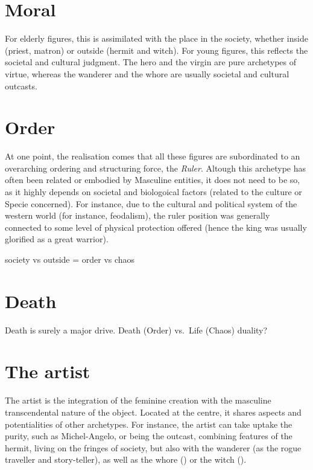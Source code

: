 \documentclass[
]{book}
\begin{document}
\hypertarget{moral}{%
\section{Moral}\label{moral}}

For elderly figures, this is assimilated with the place in the society, whether inside (priest, matron) or outside (hermit and witch). For young figures, this reflects the societal and cultural judgment. The hero and the virgin are pure archetypes of virtue, whereas the wanderer and the whore are usually societal and cultural outcasts.

\hypertarget{order}{%
\section{Order}\label{order}}

At one point, the realisation comes that all these figures are subordinated to an overarching ordering and structuring force, the \emph{Ruler}. Altough this archetype has often been related or embodied by Masculine entities, it does not need to be so, as it highly depends on societal and biologoical factors (related to the culture or Specie concerned). For instance, due to the cultural and political system of the western world (for instance, feodalism), the ruler position was generally connected to some level of physical protection offered (hence the king was usually glorified as a great warrior).

society vs outside = order vs chaos

\hypertarget{death}{%
\section{Death}\label{death}}

Death is surely a major drive. Death (Order) vs.~Life (Chaos) duality?

\hypertarget{the-artist}{%
\section{The artist}\label{the-artist}}

The artist is the integration of the feminine creation with the masculine transcendental nature of the object. Located at the centre, it shares aspects and potentialities of other archetypes. For instance, the artist can take uptake the purity, such as Michel-Angelo, or being the outcast, combining features of the hermit, living on the fringes of society, but also with the wanderer (as the rogue traveller and story-teller), as well as the whore () or the witch ().
\end{document}
